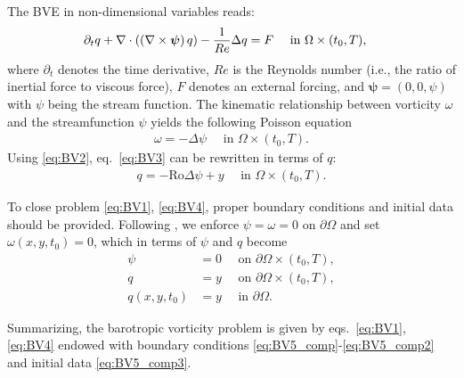 \documentclass[11pt,a4paper]{article}
\begin{document}
The BVE in non-dimensional variables reads:
\begin{align}
\partial_t q+ \nabla\cdot \left(\left(\nabla \times \mbox{\boldmath{$\psi$}}\right) q \right) - \dfrac{1}{Re} \Delta q & = F \quad \mbox{ in }\Omega \times (t_0,T), \label{eq:BV1}
\end{align}
where $\partial_t$ denotes the time derivative, $Re$ is the Reynolds number (i.e., the ratio of inertial force to viscous force), 
$F$ denotes an external forcing, and $\bm{\psi} = (0, 0, \psi)$ with  $\psi$ being the stream function. 
The kinematic relationship between vorticity $\omega$ and the streamfunction $\psi$
yields the following Poisson equation
\begin{align}
\omega = - \Delta \psi \quad \mbox{ in }\Omega \times (t_0,T). \label{eq:BV3}
\end{align}
Using \eqref{eq:BV2}, eq.~\eqref{eq:BV3} can be rewritten in terms of $q$:
\begin{align}
q = -\text{Ro} \Delta \psi + y \quad \mbox{ in }\Omega \times (t_0,T).  \label{eq:BV4}
\end{align}

To close problem \eqref{eq:BV1}, \eqref{eq:BV4}, proper boundary conditions and initial data should be provided. 
Following \cite{Nadiga2001,Holm2003,Monteiro2015,Monteiro2014,San2012}, we enforce $\psi = \omega = 0$ 
on $\partial \Omega$ and set $\omega(x,y,t_0) = 0$, which in terms of $\psi$ and $q$ become 
\begin{align}
\psi &= 0 \quad \mbox{ on }\partial \Omega \times (t_0,T), \label{eq:BV5_comp} \\
q &= y \quad \mbox{ on }\partial \Omega \times (t_0,T), \label{eq:BV5_comp2} \\
q(x,y,t_0) &= y \quad \mbox{ in }\partial \Omega. \label{eq:BV5_comp3}
\end{align}


Summarizing, the barotropic vorticity problem
is given by eqs.~\eqref{eq:BV1}, \eqref{eq:BV4} endowed with boundary conditions \eqref{eq:BV5_comp}-\eqref{eq:BV5_comp2} 
and initial data \eqref{eq:BV5_comp3}.
\end{document}
